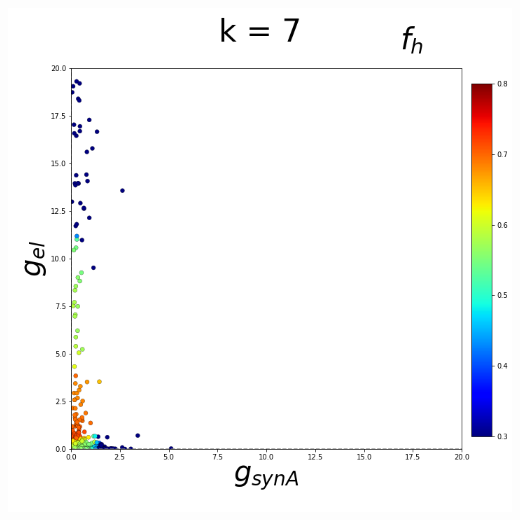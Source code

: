 \documentclass[11pt]{article}
\begin{document}
\begin{center}
\includegraphics[scale=0.125]{DSN_figs/STGCircuit_DSN_c=2_rs=2_k=7.png}
\end{center}
\end{document}
